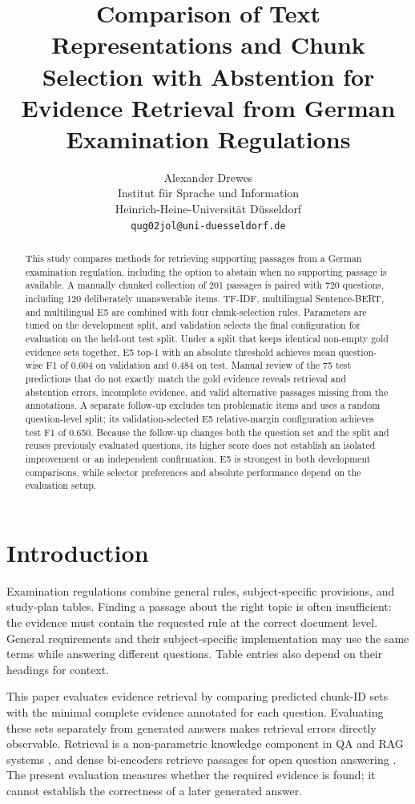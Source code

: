 \documentclass[11pt]{article}
\title{Comparison of Text Representations and Chunk Selection with Abstention for Evidence Retrieval from German Examination Regulations}
\author{Alexander Drewes \\
  Institut für Sprache und Information \\
  Heinrich-Heine-Universität Düsseldorf \\
  \texttt{qug02jol@uni-duesseldorf.de}}
\begin{document}
\maketitle

\begin{abstract}
This study compares methods for retrieving supporting passages from a German examination regulation, including the option to abstain when no supporting passage is available. A manually chunked collection of 201 passages is paired with 720 questions, including 120 deliberately unanswerable items. TF-IDF, multilingual Sentence-BERT, and multilingual E5 are combined with four chunk-selection rules. Parameters are tuned on the development split, and validation selects the final configuration for evaluation on the held-out test split. Under a split that keeps identical non-empty gold evidence sets together, E5 top-1 with an absolute threshold achieves mean question-wise F1 of 0.604 on validation and 0.484 on test. Manual review of the 75 test predictions that do not exactly match the gold evidence reveals retrieval and abstention errors, incomplete evidence, and valid alternative passages missing from the annotations. A separate follow-up excludes ten problematic items and uses a random question-level split; its validation-selected E5 relative-margin configuration achieves test F1 of 0.650. Because the follow-up changes both the question set and the split and reuses previously evaluated questions, its higher score does not establish an isolated improvement or an independent confirmation. E5 is strongest in both development comparisons, while selector preferences and absolute performance depend on the evaluation setup.
\end{abstract}

\section{Introduction}

Examination regulations combine general rules, subject-specific provisions, and study-plan tables. Finding a passage about the right topic is often insufficient: the evidence must contain the requested rule at the correct document level. General requirements and their subject-specific implementation may use the same terms while answering different questions. Table entries also depend on their headings for context.

This paper evaluates evidence retrieval by comparing predicted chunk-ID sets with the minimal complete evidence annotated for each question. Evaluating these sets separately from generated answers makes retrieval errors directly observable. Retrieval is a non-parametric knowledge component in QA and RAG systems \citep{lewis2020rag}, and dense bi-encoders retrieve passages for open question answering \citep{karpukhin-etal-2020-dense}. The present evaluation measures whether the required evidence is found; it cannot establish the correctness of a later generated answer.
\end{document}
